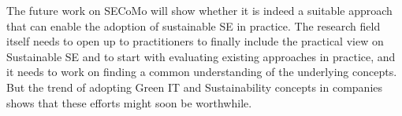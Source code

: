 \documentclass[oribibl]{llncs}
\begin{document}
The future work on SECoMo will show whether it is indeed a suitable approach that can enable the adoption of sustainable SE in practice. The research field itself needs to open up to practitioners to finally include the practical view on Sustainable SE and to start with evaluating existing approaches in practice, and it needs to work on finding a common understanding of the underlying concepts. But the trend of adopting Green IT and Sustainability concepts in companies shows that these efforts might soon be worthwhile.




%
%

%
\end{document}
